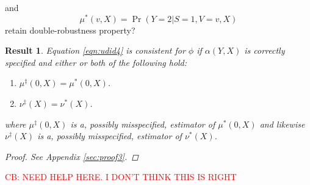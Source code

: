 \documentclass[12pt]{article}
\newtheorem{result}{Result}
\begin{document}
    and 
    \[\mu^*(v,X) = \Pr(Y=2|S=1,V=v,X)\]
    retain double-robustness property?
    \newpage
\begin{result}\label{res3}
    Equation \ref{eqn:udid4} is consistent for $\phi$ if $\alpha(Y,X)$ is correctly specified and either or both of the following hold:
    \begin{enumerate}
        \item $\mu^\ddagger(0,X) = \mu^*(0,X)$.
        \item $\nu^\ddagger(X) = \nu^*(X)$.
    \end{enumerate}
    where  $\mu^\ddagger(0,X)$ is a, possibly misspecified, estimator of $\mu^*(0,X)$ and likewise $\nu^\ddagger(X)$ is a, possibly misspecified, estimator of $\nu^*(X)$.
    \begin{proof}
        See Appendix \ref{sec:proof3}.
    \end{proof}
\end{result}

\textcolor{red}{CB: NEED HELP HERE. I DON'T THINK THIS IS RIGHT}
\end{document}
